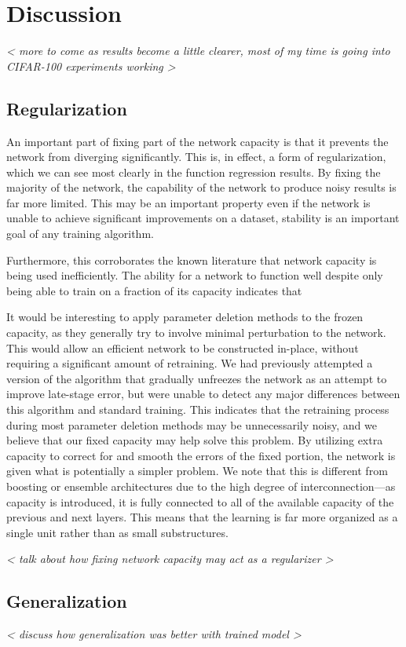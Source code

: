 \chapter{Discussion}
\emph{ < more to come as results become a little clearer, most of my time is going into CIFAR-100 experiments working > }

\section{Regularization}

An important part of fixing part of the network capacity is that it prevents the network from diverging significantly.
This is, in effect, a form of regularization, which we can see most clearly in the function regression results.
By fixing the majority of the network, the capability of the network to produce noisy results is far more limited.
This may be an important property even if the network is unable to achieve significant improvements on a dataset, stability is an important goal of any training algorithm.

Furthermore, this corroborates the known literature that network capacity is being used inefficiently.
The ability for a network to function well despite only being able to train on a fraction of its capacity indicates that 

It would be interesting to apply parameter deletion methods to the frozen capacity, as they generally try to involve minimal perturbation to the network.
This would allow an efficient network to be constructed in-place, without requiring a significant amount of retraining.
We had previously attempted a version of the algorithm that gradually unfreezes the network as an attempt to improve late-stage error, but were unable to detect any major differences between this algorithm and standard training.
This indicates that the retraining process during most parameter deletion methods may be unnecessarily noisy, and we believe that our fixed capacity may help solve this problem.
By utilizing extra capacity to correct for and smooth the errors of the fixed portion, the network is given what is potentially a simpler problem.
We note that this is different from boosting or ensemble architectures due to the high degree of interconnection---as capacity is introduced, it is fully connected to all of the available capacity of the previous and next layers.
This means that the learning is far more organized as a single unit rather than as small substructures.

\emph{ < talk about how fixing network capacity may act as a regularizer > }

\section{Generalization}
\emph{ < discuss how generalization was better with trained model > }

